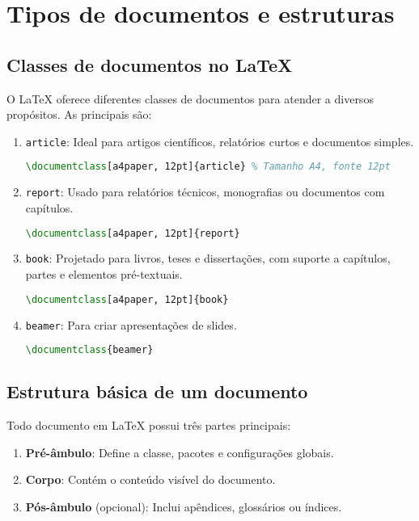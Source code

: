 \chapter{Tipos de documentos e estruturas}



\section{Classes de documentos no LaTeX}

O LaTeX oferece diferentes classes de documentos para atender a diversos propósitos. As principais são:
\begin{enumerate}
    \item \verb|article|: Ideal para artigos científicos, relatórios curtos e documentos simples.
    \begin{lstlisting}[language=tex]
    \documentclass[a4paper, 12pt]{article} % Tamanho A4, fonte 12pt
    \end{lstlisting}
    \item \verb|report|: Usado para relatórios técnicos, monografias ou documentos com capítulos.
    \begin{lstlisting}[language=tex]
    \documentclass[a4paper, 12pt]{report}
    \end{lstlisting}
    \item \verb|book|: Projetado para livros, teses e dissertações, com suporte a capítulos, partes e elementos pré-textuais.
    \begin{lstlisting}[language=tex]
    \documentclass[a4paper, 12pt]{book}
    \end{lstlisting}
    \item \verb|beamer|: Para criar apresentações de slides.
    \begin{lstlisting}[language=tex]
    \documentclass{beamer}
    \end{lstlisting}
\end{enumerate}

\section{Estrutura básica de um documento}
Todo documento em LaTeX possui três partes principais:
\begin{enumerate}
    \item \textbf{Pré-âmbulo}: Define a classe, pacotes e configurações globais.
    \item \textbf{Corpo}: Contém o conteúdo visível do documento.
    \item \textbf{Pós-âmbulo} (opcional): Inclui apêndices, glossários ou índices.
\end{enumerate}


